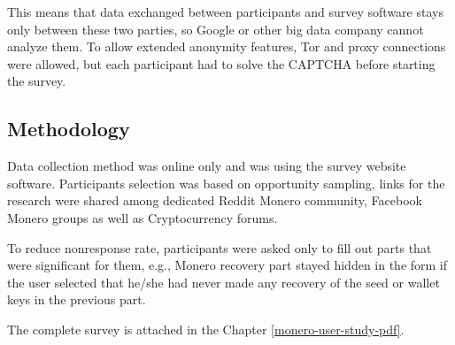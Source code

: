 \documentclass[
  printed, %
  table,   %
  nolof,     %
  nolot,     %
           oneside, color
]{fithesis3}
\begin{document}
This means that data exchanged between participants and survey software stays only between these two parties, so Google or other big data company cannot analyze them. To allow extended anonymity features, Tor and proxy connections were allowed, but each participant had to solve the CAPTCHA before starting the survey.
\subsection{Methodology}
Data collection method was online only and was using the survey website software. Participants selection was based on opportunity sampling, links for the research were shared among dedicated Reddit Monero community, Facebook Monero groups as well as Cryptocurrency forums.

To reduce nonresponse rate, participants were asked only to fill out parts that were significant for them, e.g., Monero recovery part stayed hidden in the form if the user selected that he/she had never made any recovery of the seed or wallet keys in the previous part. 

The complete survey is attached in the Chapter \ref{monero-user-study-pdf}.
\end{document}
